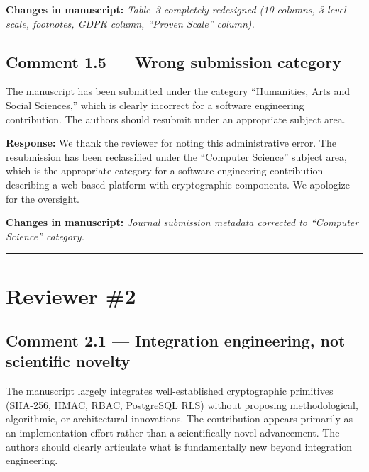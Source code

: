 \documentclass[11pt,a4paper]{article}
\newcommand{\response}[1]{\par\noindent\textcolor{responsecolor}{\textbf{Response:}} #1}
\newcommand{\change}[1]{\par\noindent\textcolor{changecolor}{\textbf{Changes in manuscript:}} \textit{#1}}
\begin{document}
\change{Table~3 completely redesigned (10 columns, 3-level scale, footnotes, GDPR column, ``Proven Scale'' column).}

\bigskip

\subsection*{Comment 1.5 --- Wrong submission category}

\begin{reviewerbox}
The manuscript has been submitted under the category ``Humanities, Arts and Social Sciences,'' which is clearly incorrect for a software engineering contribution. The authors should resubmit under an appropriate subject area.
\end{reviewerbox}

\response{We thank the reviewer for noting this administrative error. The resubmission has been reclassified under the ``Computer Science'' subject area, which is the appropriate category for a software engineering contribution describing a web-based platform with cryptographic components. We apologize for the oversight.}

\change{Journal submission metadata corrected to ``Computer Science'' category.}

\bigskip
\hrule
\bigskip

\section*{Reviewer \#2}

\subsection*{Comment 2.1 --- Integration engineering, not scientific novelty}

\begin{reviewerbox}
The manuscript largely integrates well-established cryptographic primitives (SHA-256, HMAC, RBAC, PostgreSQL RLS) without proposing methodological, algorithmic, or architectural innovations. The contribution appears primarily as an implementation effort rather than a scientifically novel advancement. The authors should clearly articulate what is fundamentally new beyond integration engineering.
\end{reviewerbox}
\end{document}
